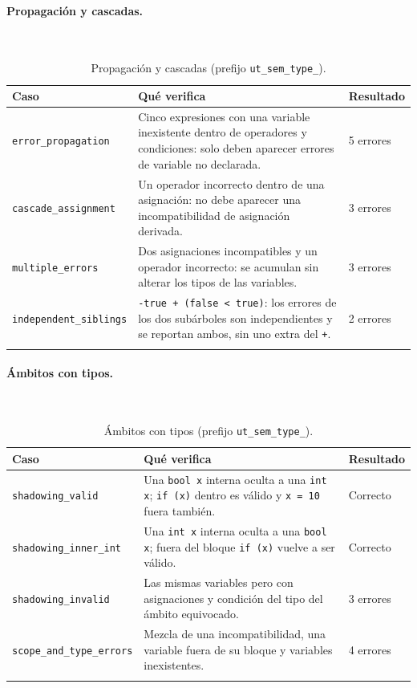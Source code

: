 \documentclass[12pt,letterpaper]{article}
\begin{document}
\paragraph{Propagación y cascadas.}\mbox{}\\[0.3em]
\begin{longtable}{|p{5.2cm}|p{7.6cm}|p{3.4cm}|}
\hline
\textbf{Caso} & \textbf{Qué verifica} & \textbf{Resultado} \\ \hline \endhead
\footnotesize\texttt{error\_propagation} & \small Cinco expresiones con una variable inexistente dentro de operadores y condiciones: solo deben aparecer errores de variable no declarada. & \small 5 errores \\ \hline
\footnotesize\texttt{cascade\_assignment} & \small Un operador incorrecto dentro de una asignación: no debe aparecer una incompatibilidad de asignación derivada. & \small 3 errores \\ \hline
\footnotesize\texttt{multiple\_errors} & \small Dos asignaciones incompatibles y un operador incorrecto: se acumulan sin alterar los tipos de las variables. & \small 3 errores \\ \hline
\footnotesize\texttt{independent\_siblings} & \small \texttt{-true + (false < true)}: los errores de los dos subárboles son independientes y se reportan ambos, sin uno extra del \texttt{+}. & \small 2 errores \\ \hline
\caption{Propagación y cascadas (prefijo \texttt{ut\_sem\_type\_}).}
\end{longtable}
\paragraph{Ámbitos con tipos.}\mbox{}\\[0.3em]
\begin{longtable}{|p{5.2cm}|p{7.6cm}|p{3.4cm}|}
\hline
\textbf{Caso} & \textbf{Qué verifica} & \textbf{Resultado} \\ \hline \endhead
\footnotesize\texttt{shadowing\_valid} & \small Una \texttt{bool x} interna oculta a una \texttt{int x}; \texttt{if (x)} dentro es válido y \texttt{x = 10} fuera también. & \small Correcto \\ \hline
\footnotesize\texttt{shadowing\_inner\_int} & \small Una \texttt{int x} interna oculta a una \texttt{bool x}; fuera del bloque \texttt{if (x)} vuelve a ser válido. & \small Correcto \\ \hline
\footnotesize\texttt{shadowing\_invalid} & \small Las mismas variables pero con asignaciones y condición del tipo del ámbito equivocado. & \small 3 errores \\ \hline
\footnotesize\texttt{scope\_and\_type\_errors} & \small Mezcla de una incompatibilidad, una variable fuera de su bloque y variables inexistentes. & \small 4 errores \\ \hline
\caption{Ámbitos con tipos (prefijo \texttt{ut\_sem\_type\_}).}
\end{longtable}
\end{document}
